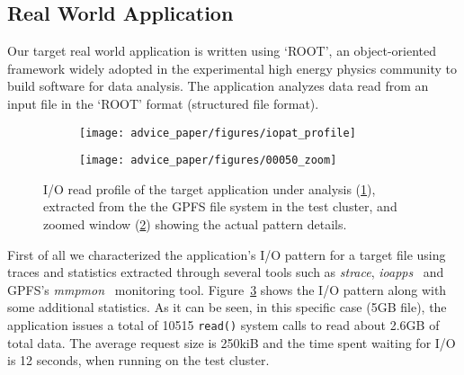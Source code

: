 
\subsection{Real World Application}
\label{subsec: application}
Our target real world application is written using `ROOT', an object-oriented framework widely adopted in the experimental high energy physics community to build software for data analysis. The application analyzes data read from an input file in the `ROOT' format (structured file format). %

\begin{figure}[!htb]
  \centering
  \begin{subfigure}[t]{\columnwidth}
    \centering
    \texttt{[image: advice\_paper/figures/iopat\_profile]}
    \caption{\textit{}}
    \label{figure: iopat_profile}
  \end{subfigure}
  \begin{subfigure}[t]{\columnwidth}
    \centering
    \texttt{[image: advice\_paper/figures/00050\_zoom]}
    \caption{\textit{}}
    \label{figure: iopat_zoom}
  \end{subfigure}
  \caption{I/O read profile of the target application under analysis (\ref{figure: iopat_profile}), extracted from the the GPFS file system in the test cluster, and zoomed window (\ref{figure: iopat_zoom}) showing the actual pattern details.}
  \label{figure: iopattern_with_statistics}
\end{figure}

First of all we characterized the application's I/O pattern for a target file using traces and statistics extracted through several tools such as \textit{strace}, \textit{ioapps}~\cite{ioapps} and GPFS's \textit{mmpmon}~\cite{mmpmon} monitoring tool. Figure~\ref{figure: iopattern_with_statistics} shows the I/O pattern along with some additional statistics. As it can be seen, in this specific case (5GB file), the application issues a total of 10515 \texttt{read()} system calls to read about 2.6GB of total data. The average request size is 250kiB and the time spent waiting for I/O is 12 seconds, when running on the test cluster. 

